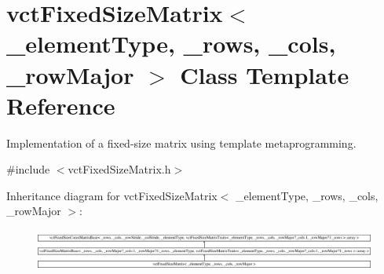 \hypertarget{classvct_fixed_size_matrix}{}\section{vct\+Fixed\+Size\+Matrix$<$ \+\_\+element\+Type, \+\_\+rows, \+\_\+cols, \+\_\+row\+Major $>$ Class Template Reference}
\label{classvct_fixed_size_matrix}


Implementation of a fixed-\/size matrix using template metaprogramming.  




{\ttfamily \#include $<$vct\+Fixed\+Size\+Matrix.\+h$>$}

Inheritance diagram for vct\+Fixed\+Size\+Matrix$<$ \+\_\+element\+Type, \+\_\+rows, \+\_\+cols, \+\_\+row\+Major $>$\+:\begin{figure}[H]
\begin{center}
\leavevmode
\includegraphics[height=1.420118cm]{d2/d1e/classvct_fixed_size_matrix}
\end{center}
\end{figure}
